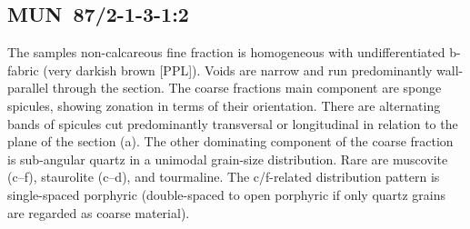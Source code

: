 \documentclass[a4paper]{article}
\begin{document}
\newpage\subsection{MUN~87/2-1-3-1:2 \citep[mun\#103; Fig.~\ref{fig:mun.pottery}.7; Pikunda-Munda style;][473 Pl.~92.2]{Seidensticker.2021e}}

\begin{multicols}{2}
\noindent The samples non-calcareous fine fraction is homogeneous with undifferentiated b-fabric (very darkish brown [PPL]). Voids are narrow and run predominantly wall-parallel through the section. The coarse fractions main component are sponge spicules, showing zonation in terms of their orientation. There are alternating bands of spicules cut predominantly transversal or longitudinal in relation to the plane of the section (a). The other dominating component of the coarse fraction is sub-angular quartz in a unimodal grain-size distribution. Rare are muscovite (c--f), staurolite (c--d), and tourmaline. The c/f-related distribution pattern is single-spaced porphyric (double-spaced to open porphyric if only quartz grains are regarded as coarse material).
\end{multicols}
\end{document}
